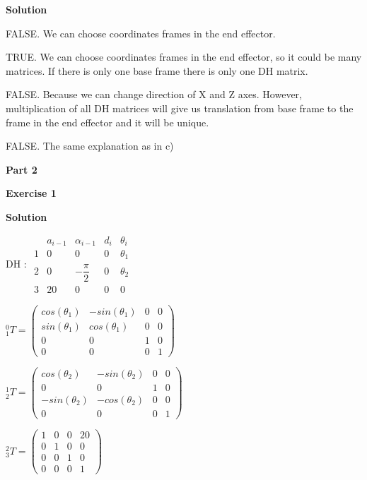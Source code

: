 \documentclass[8pt]{article}
\begin{document}
\textbf{Solution}

\medskip

\begin{list}{()~}{}
\item
FALSE. We can choose coordinates frames in the end effector.
\item
TRUE. We can choose coordinates frames in the end effector, so it could be many matrices. If there is only one base frame there is only one DH matrix.
\item
FALSE. Because we can change direction of X and Z axes. However, multiplication of all DH matrices will give us translation from base frame to the frame in the end effector and it will be unique.
\item
FALSE. The same explanation as in c)
\end{list}

\textbf{Part 2}	

\bigskip

\textbf{Exercise 1}		
		
\textbf{Solution}

\medskip

DH :
$ \begin{array}{ccccc}
&a_{i-1} & \alpha_{i-1} & d_i & \theta_i \\
1&0 & 0 & 0 & \theta_1 \\
2&0 & - \dfrac{\pi}{2} & 0 & \theta_2 \\
3&20 & 0 & 0 & 0
\end{array} $

$^0_1T = \left( \begin{array}{cccc}
cos(\theta_1) & -sin(\theta_1) & 0 & 0 \\
sin(\theta_1) & cos(\theta_1) & 0 & 0 \\
0 & 0 & 1 & 0 \\
0 & 0 & 0 & 1
\end{array} \right) $

$^1_2T = \left( \begin{array}{cccc}
cos(\theta_2) & -sin(\theta_2) & 0 & 0 \\
0 & 0 & 1 & 0 \\
-sin(\theta_2) & -cos(\theta_2) & 0 & 0 \\
0 & 0 & 0 & 1
\end{array} \right) $

$^2_3T = \left( \begin{array}{cccc}
1 & 0 & 0 & 20 \\
0 & 1 & 0 & 0 \\
0& 0 & 1 & 0 \\
0 & 0 & 0 & 1
\end{array} \right) $
\end{document}
